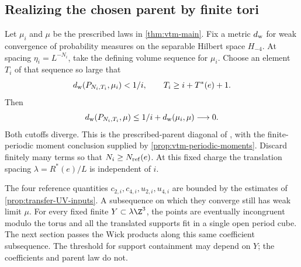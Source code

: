 \subsection{Realizing the chosen parent by finite tori}

Let $\mu_i$ and $\mu$ be the prescribed laws in
\cref{thm:vtm-main}. Fix a metric $d_{\rm w}$ for weak
convergence of probability measures on the separable Hilbert
space $H_{-4}$. At spacing $\eta_i=L^{-N_i}$, take the
defining volume sequence for $\mu_i$. Choose an element
$T_i$ of that sequence so large that
\[
 d_{\rm w}(P_{N_i,T_i},\mu_i)<1/i,\qquad
 T_i\ge i+T^*(e)+1.
\]
Then
\[
 d_{\rm w}(P_{N_i,T_i},\mu)
 \le1/i+d_{\rm w}(\mu_i,\mu)\longrightarrow0.
\]
Both cutoffs diverge. This is the prescribed-parent
diagonal of \cite[Corollary~7.4]{ContinuumExistence},
with the finite-periodic moment conclusion supplied by
\cref{prop:vtm-periodic-moments}. Discard finitely many terms
so that $N_i\ge N_{\rm ref}(e)$.
At this fixed charge the translation spacing
$\lambda=R^*(e)/L$ is independent of $i$.

The four reference quantities
$c_{2,i},c_{4,i},u_{2,i},u_{4,i}$ are bounded by the estimates
of \cref{prop:transfer-UV-inputs}. A subsequence on which
they converge still has weak limit $\mu$.
For every fixed finite $Y\subset\lambda\Z^3$, the points
are eventually incongruent modulo the torus and all the
translated supports fit in a single open period cube.
The next section passes the Wick products along this
same coefficient subsequence. The threshold for support
containment may depend on $Y$; the coefficients and parent
law do not.


